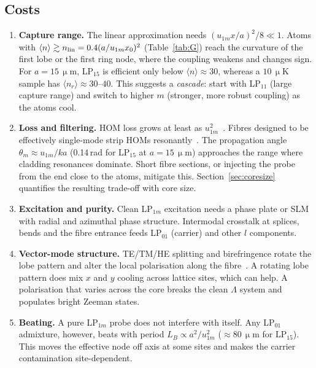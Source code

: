 \documentclass[11pt,a4paper]{article}
\newcommand{\micrometre}{\upmu m}\newcommand{\microkelvin}{\upmu K}
\newcommand{\SI}[2]{\ensuremath{#1\,\mathrm{#2}}}
\begin{document}
\subsection{Costs}
\begin{enumerate}
\item \textbf{Capture range.} The linear approximation needs $(u_{1m}x/a)^2/8\ll1$. Atoms with $\langle n\rangle\gtrsim n_{\rm lin}=0.4(a/u_{1m}x_0)^2$ (Table~\ref{tab:G}) reach the curvature of the first lobe or the first ring node, where the coupling weakens and changes sign. For $a=\SI{15}{\micrometre}$, LP$_{15}$ is efficient only below $\langle n\rangle\approx30$, whereas a \SI{10}{\microkelvin} sample has $\langle n_r\rangle\approx30$--$40$. This suggests a \emph{cascade}: start with LP$_{11}$ (large capture range) and switch to higher $m$ (stronger, more robust coupling) as the atoms cool.
\item \textbf{Loss and filtering.} HOM loss grows at least as $u_{1m}^2$~\cite{marcatili1964}. Fibres designed to be effectively single-mode strip HOMs resonantly~\cite{uebel2016,poletti2014}. The propagation angle $\theta_m\approx u_{1m}/ka$ (0.14\,rad for LP$_{15}$ at $a=\SI{15}{\micrometre}$) approaches the range where cladding resonances dominate. Short fibre sections, or injecting the probe from the end close to the atoms, mitigate this. Section~\ref{sec:coresize} quantifies the resulting trade-off with core size.
\item \textbf{Excitation and purity.} Clean LP$_{1m}$ excitation needs a phase plate or SLM with radial and azimuthal phase structure. Intermodal crosstalk at splices, bends and the fibre entrance feeds LP$_{01}$ (carrier) and other $l$ components.
\item \textbf{Vector-mode structure.} TE/TM/HE splitting and birefringence rotate the lobe pattern and alter the local polarisation along the fibre~\cite{snyder1983,ramachandran2013}. A rotating lobe pattern does mix $x$ and $y$ cooling across lattice sites, which can help. A polarisation that varies across the core breaks the clean $\Lambda$ system and populates bright Zeeman states.
\item \textbf{Beating.} A pure LP$_{1m}$ probe does not interfere with itself. Any LP$_{01}$ admixture, however, beats with period $L_B\propto a^2/u_{1m}^2$ ($\approx\SI{80}{\micrometre}$ for LP$_{15}$). This moves the effective node off axis at some sites and makes the carrier contamination site-dependent.
\end{enumerate}
\end{document}
